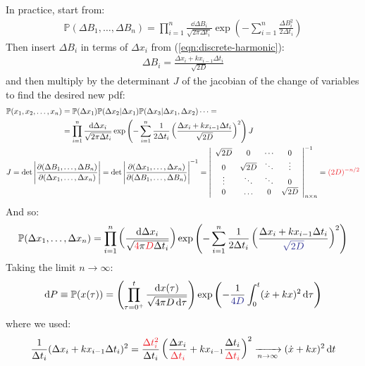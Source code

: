 \documentclass[../template.tex]{subfiles}
\begin{document}
In practice, start from:
\begin{align*}
    \mathbb{P}(\Delta B_1, \dots, \Delta B_n) = \prod_{i=1}^n \frac{\dd{\Delta B_i}}{\sqrt{2 \pi \Delta t_i}} \exp\left(-\sum_{i=1}^n \frac{\Delta B_i^2}{ 2 \Delta t_i} \right) 
\end{align*} 
Then insert $\Delta B_i$ in terms of $\Delta x_i$ from (\ref{eqn:discrete-harmonic}):
\begin{align*}
    \Delta B_i = \frac{\Delta x_i + k x_{i-1} \Delta t_i}{\sqrt{2D}} 
\end{align*}
and then multiply by the determinant $J$ of the jacobian of the change of variables to find the desired new pdf:
\begin{align*}
    \mathbb{P}(x_1, x_2, \dots, x_n) &= \mathbb{P}(\Delta x_1) \mathbb{P}(\Delta x_2 | \Delta x_1) \mathbb{P}(\Delta x_3 | \Delta x_1, \Delta x_2) \cdots =\\
    &= \prod_{i=1}^n \frac{\dd{\Delta x_i}}{\sqrt{2 \pi \Delta t_i}} \exp\left(-\sum_{i=1}^n \frac{1}{2 \Delta t_i} \left(\frac{\Delta x_i + k x_{i-1} \Delta t_i}{\sqrt{2 D}} \right)^2 \right) J\\
    \span
    J = \operatorname{det}\Bigg| \pdv{(\Delta B_1, \dots, \Delta B_n)}{(\Delta x_1, \dots, \Delta x_n)}\Bigg| = \operatorname{det} \Bigg|\pdv{(\Delta x_1, \dots, \Delta x_n)}{(\Delta B_1, \dots, \Delta B_n)}\Bigg|^{-1} = \left|\begin{array}{cccc}
    \sqrt{2D} & 0 & \cdots & 0 \\ 
    0 & \sqrt{2D} & \ddots & \vdots \\ 
    \vdots & \ddots & \ddots & 0 \\ 
    0 & \dots & 0 & \sqrt{2D}
    \end{array}\right|^{-1}_{n \times n} = \textcolor{Red}{(2 D)^{-n/2}}
\end{align*}
And so:
\begin{align} \label{eqn:H1}
    \mathbb{P}(\Delta x_1, \dots, \Delta x_n) = \prod_{i=1}^n \left(\frac{\dd{\Delta x_i}}{\sqrt{\textcolor{Red}{4} \pi \textcolor{Red}{D} \Delta t_i}}\right) \exp\left(-\sum_{i=1}^n \frac{1}{2 \Delta t_i} \left(\frac{\Delta x_i + k x_{i-1} \Delta t_i}{\textcolor{Blue}{\sqrt{2D}}} \right)^2 \right) 
\end{align}
Taking the limit $n \to \infty$:
\begin{align*}
    \dd{P} \equiv 
    \mathbb{P}(x(\tau)) = \left(\prod_{\tau = 0^+}^t \frac{\dd{x(\tau)}}{\sqrt{4 \pi D \dd{\tau}}}\right) \exp\left(-\frac{1}{\textcolor{Blue}{4 D}} \int_0^t (\dot{x} + k x)^2 \dd{\tau} \right) 
\end{align*}
where we used:
\begin{align*}
    \frac{1}{\Delta t_i} (\Delta x_i + k x_{i-1} \Delta t_i)^2 = \frac{\textcolor{Red}{\Delta t_i^2}}{\Delta t_i} \left(\frac{\Delta x_i}{\textcolor{Red}{\Delta t_i}} + k x_{i-1} \frac{\Delta t_i}{\textcolor{Red}{\Delta t_i}}   \right)^2  \xrightarrow[n \to \infty]{}  (\dot{x} + kx)^2 \dd{t}
\end{align*}
\end{document}

